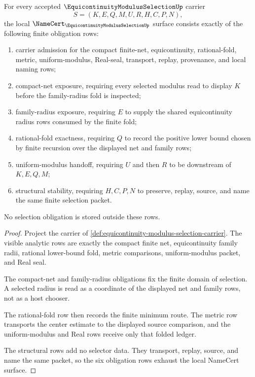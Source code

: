 \begin{theorem}
\label{thm:equicontinuity-modulus-selection-namecert-obligations}
For every accepted $\EquicontinuityModulusSelectionUp$ carrier
$$
S=(K,E,Q,M,U,R,H,C,P,N),
$$
the local $\NameCert_{\EquicontinuityModulusSelectionUp}$ surface consists exactly of the following finite obligation rows:
\begin{enumerate}
\item carrier admission for the compact finite-net, equicontinuity, rational-fold, metric, uniform-modulus, Real-seal, transport, replay, provenance, and local naming rows;
\item compact-net exposure, requiring every selected modulus read to display $K$ before the family-radius fold is inspected;
\item family-radius exposure, requiring $E$ to supply the shared equicontinuity radius rows consumed by the finite fold;
\item rational-fold exactness, requiring $Q$ to record the positive lower bound chosen by finite recursion over the displayed net and family rows;
\item uniform-modulus handoff, requiring $U$ and then $R$ to be downstream of $K,E,Q,M$;
\item structural stability, requiring $H,C,P,N$ to preserve, replay, source, and name the same finite selection packet.
\end{enumerate}
No selection obligation is stored outside these rows.
\end{theorem}
\begin{proof}
Project the carrier of \autoref{def:equicontinuity-modulus-selection-carrier}. The visible analytic rows are exactly the compact finite net, equicontinuity family radii, rational lower-bound fold, metric comparisons, uniform-modulus packet, and Real seal.

The compact-net and family-radius obligations fix the finite domain of selection. A selected radius is read as a coordinate of the displayed net and family rows, not as a host chooser.

The rational-fold row then records the finite minimum route. The metric row transports the center estimate to the displayed source comparison, and the uniform-modulus and Real rows receive only that folded ledger.

The structural rows add no selector data. They transport, replay, source, and name the same packet, so the six obligation rows exhaust the local NameCert surface.
\end{proof}

